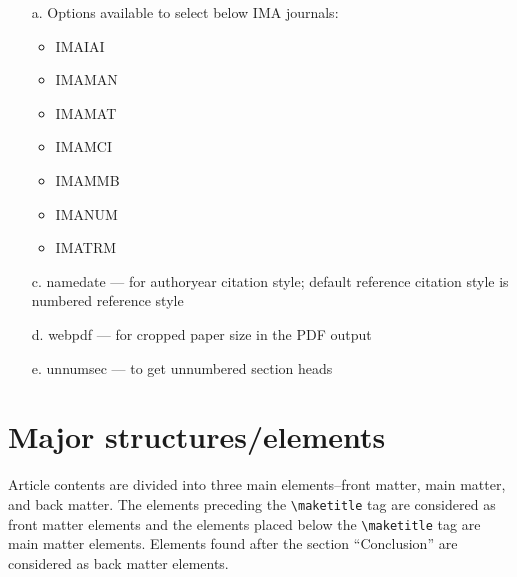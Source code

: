 \documentclass{article}
\begin{document}
\begin{enumerate}
\item[a.] Options available to select below IMA journals:
\begin{itemize}
\item IMAIAI
\item IMAMAN
\item IMAMAT
\item IMAMCI
\item IMAMMB
\item IMANUM
\item IMATRM
\end{itemize}
\item[c.] namedate --- for authoryear citation style; default reference citation style is numbered reference style
\item[d.] webpdf --- for cropped paper size in the PDF output
\item[e.] unnumsec --- to get unnumbered section heads
\end{enumerate}

\section{Major structures/elements}

Article contents are divided into three main elements--front matter, main matter, and back matter. The elements preceding the \verb+\maketitle+ tag are considered as front matter elements and the elements placed below the \verb+\maketitle+ tag are main matter elements. Elements found after the section ``Conclusion'' are considered as back matter elements.
\end{document}
